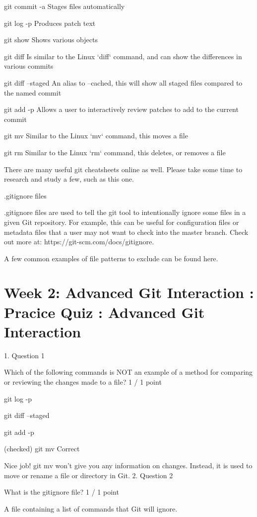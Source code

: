 \documentclass[11pt, onecolumn]{article}
\begin{document}
git commit -a
Stages files automatically

git log -p
Produces patch text

git show
Shows various objects

git diff
Is similar to the Linux `diff` command, and can show the differences in various commits

git diff --staged
An alias to --cached, this will show all staged files compared to the named commit

git add -p
Allows a user to interactively review patches to add to the current commit

git mv
Similar to the Linux `mv` command, this moves a file

git rm
Similar to the Linux `rm` command, this deletes, or removes a file


There are many useful git cheatsheets online as well. Please take some time to research and study a few, such as this one.

.gitignore files

.gitignore files are used to tell the git tool to intentionally ignore some files in a given Git repository. For example, this can be useful for configuration files or metadata files that a user may not want to check into the master branch. Check out more at: https://git-scm.com/docs/gitignore.

A few common examples of file patterns to exclude can be found here.


\section{Week 2: Advanced Git Interaction : Pracice Quiz : Advanced Git Interaction}

1.
Question 1

Which of the following commands is NOT an example of a method for comparing or reviewing the changes made to a file?
1 / 1 point

git log -p

git diff --staged

git add -p

(checked) git mv
Correct

Nice job! git mv won't give you any information on changes. Instead, it is used to move or rename a file or directory in Git.
2.
Question 2

What is the gitignore file?
1 / 1 point

A file containing a list of commands that Git will ignore.
\end{document}
